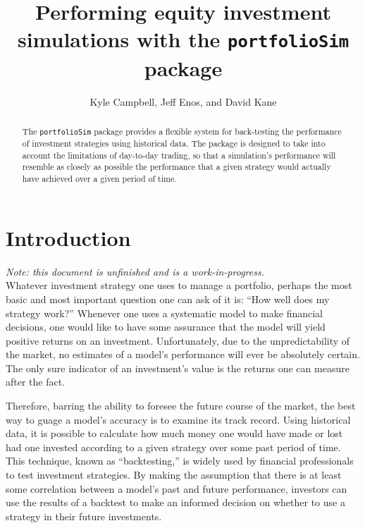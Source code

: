 \documentclass{article}
\begin{document}
\title{Performing equity investment simulations with the \texttt{portfolioSim} package}
\author{Kyle Campbell, Jeff Enos, and David Kane}


\maketitle


\setcounter{secnumdepth}{3}


\begin{abstract}
\label{abstract}

The \texttt{portfolioSim} package provides a flexible system for
back-testing the performance of investment strategies using historical
data.  The package is designed to take into account the limitations of
day-to-day trading, so that a simulation's performance will resemble
as closely as possible the performance that a given strategy would
actually have achieved over a given period of time.

\end{abstract}

\section{Introduction}

\emph{Note: this document is unfinished and is a work-in-progress.}
\\

Whatever investment strategy one uses to manage a portfolio, perhaps
the most basic and most important question one can ask of it is: ``How
well does my strategy work?''  Whenever one uses a systematic model to
make financial decisions, one would like to have some assurance that
the model will yield positive returns on an investment.
Unfortunately, due to the unpredictability of the market, no estimates
of a model's performance will ever be absolutely certain.  The only
sure indicator of an investment's value is the returns one can measure
after the fact.

Therefore, barring the ability to foresee the future course of the
market, the best way to guage a model's accuracy is to examine its
track record.  Using historical data, it is possible to calculate how
much money one would have made or lost had one invested according to a
given strategy over some past period of time.  This technique, known
as ``backtesting,'' is widely used by financial professionals to test
investment strategies.  By making the assumption that there is at
least some correlation between a model's past and future performance,
investors can use the results of a backtest to make an informed
decision on whether to use a strategy in their future investments.
\end{document}
